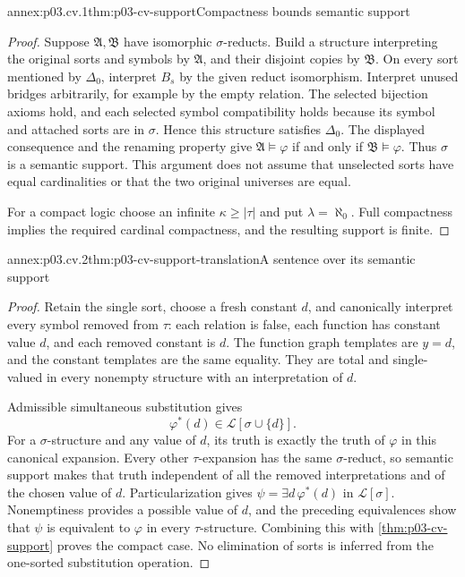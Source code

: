 \begin{annexitem}{annex:p03.cv.1}{thm:p03-cv-support}{Compactness bounds semantic support}
\begin{proof}
Suppose \(\mathfrak A,\mathfrak B\) have isomorphic
\(\sigma\)-reducts. Build a structure interpreting the original
sorts and symbols by \(\mathfrak A\), and their disjoint copies
by \(\mathfrak B\). On every sort mentioned by \(\Delta_0\),
interpret \(B_s\) by the given reduct isomorphism. Interpret
unused bridges arbitrarily, for example by the empty relation.
The selected bijection axioms hold, and each selected symbol
compatibility holds because its symbol and attached sorts are
in \(\sigma\). Hence this structure satisfies \(\Delta_0\).
The displayed consequence and the renaming property give
\(\mathfrak A\models\varphi\) if and only if
\(\mathfrak B\models\varphi\). Thus \(\sigma\) is a semantic
support. This argument does not assume that unselected sorts have
equal cardinalities or that the two original universes are equal.

For a compact logic choose an infinite \(\kappa\geq|\tau|\)
and put \(\lambda=\aleph_0\). Full compactness implies the
required cardinal compactness, and the resulting support is finite.
\end{proof}
\end{annexitem}

\begin{annexitem}{annex:p03.cv.2}{thm:p03-cv-support-translation}{A sentence over its semantic support}
\begin{proof}
Retain the single sort, choose a fresh constant \(d\), and
canonically interpret every symbol removed from \(\tau\): each
relation is false, each function has constant value \(d\), and
each removed constant is \(d\). The function graph templates are
\(y=d\), and the constant templates are the same equality.
They are total and single-valued in every nonempty structure with
an interpretation of \(d\).

Admissible simultaneous substitution gives
\[
 \varphi^*(d)\in\mathscr L[\sigma\cup\{d\}].
\]
For a \(\sigma\)-structure and any value of \(d\), its truth is
exactly the truth of \(\varphi\) in this canonical expansion.
Every other \(\tau\)-expansion has the same \(\sigma\)-reduct,
so semantic support makes that truth independent of all the
removed interpretations and of the chosen value of \(d\).
Particularization gives \(\psi=\exists d\,\varphi^*(d)\) in
\(\mathscr L[\sigma]\). Nonemptiness provides a possible value
of \(d\), and the preceding equivalences show that \(\psi\)
is equivalent to \(\varphi\) in every \(\tau\)-structure.
Combining this with \cref{thm:p03-cv-support} proves the compact
case. No elimination of sorts is inferred from the one-sorted
substitution operation.
\end{proof}
\end{annexitem}

